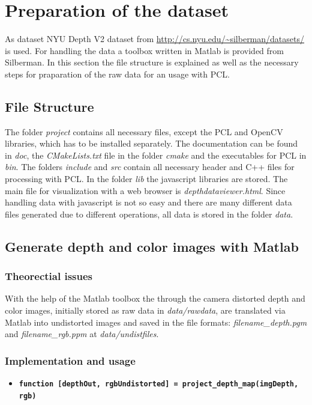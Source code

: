 \documentclass[paper=a4,11pt,bibliography=totoc]{scrartcl}
\begin{document}
\section{Preparation of the dataset}
%
As dataset NYU Depth V2 dataset from \url{http://cs.nyu.edu/~silberman/datasets/} is used. For handling the data a toolbox written in Matlab is provided from Silberman. In this section the file structure is explained as well as the necessary steps for praparation of the raw data for an usage with PCL. 
%
\subsection{File Structure}
The folder \textit{project} contains all necessary files, except the PCL and OpenCV libraries, which has to be installed separately. The documentation can be found in \textit{doc}, the \textit{CMakeLists.txt} file in the folder \textit{cmake} and the executables for PCL in \textit{bin}. The folders \textit{include} and \textit{src} contain all necessary header and C++ files for processing with PCL. In the folder \textit{lib} the javascript libraries are stored. The main file for visualization with a web browser is \textit{depthdataviewer.html}. Since handling data with javascript is not so easy and there are many different data files generated due to different operations, all data is stored in the folder \textit{data}.
%
\subsection{Generate depth and color images with Matlab}
\subsubsection*{\color{darkgreen}Theorectial issues}
%
With the help of the Matlab toolbox the through the camera distorted depth and color images, initially stored as raw data in \textit{data/rawdata}, are translated via Matlab into undistorted images and saved in the file formats: \textit{filename\_depth.pgm} and \textit{filename\_rgb.ppm} at \textit{data/undistfiles}.
%
\subsubsection*{\color{darkred}Implementation and usage}
%
\begin{itemize}
\item \textbf{\texttt{function [depthOut, rgbUndistorted] = project\_depth\_map(imgDepth,\\rgb)}}
\end{itemize}
%
\end{document}
